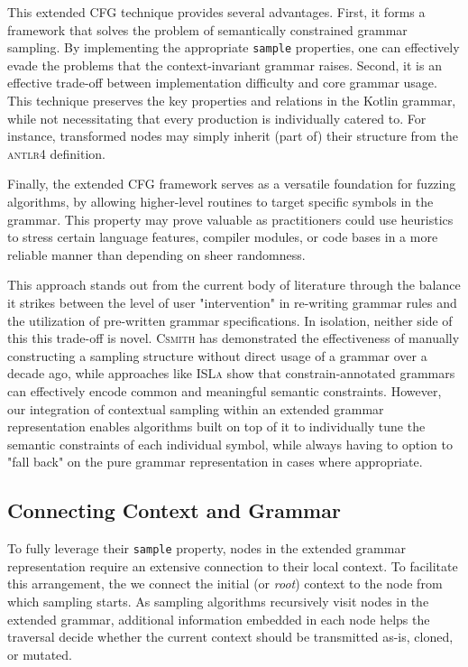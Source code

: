 This extended \gls{CFG} technique provides several advantages.
First, it forms a framework that solves the problem of semantically constrained grammar sampling.
By implementing the appropriate \texttt{sample} properties,
one can effectively evade the problems that the context-invariant grammar raises.
Second, it is an effective trade-off between implementation difficulty and core grammar usage. 
This technique preserves the key properties and relations in the Kotlin grammar, while
not necessitating that every production is individually catered to. 
For instance, transformed nodes may simply inherit (part of) their structure from the
\textsc{antlr4} definition.

Finally, the extended \gls{CFG} framework serves as a versatile foundation for fuzzing
algorithms, by allowing higher-level routines to target specific symbols in the grammar.
This property may prove valuable as practitioners could use heuristics to stress 
certain language features, compiler modules, or code bases in a more reliable
manner than depending on sheer randomness.

This approach stands out from the current body of literature through 
the balance it strikes between the level of user "intervention" in re-writing grammar
rules and the utilization of pre-written grammar specifications.
In isolation, neither side of this this trade-off is novel.
\textsc{Csmith} \cite{yang2011finding} has demonstrated the effectiveness
of manually constructing a sampling structure without
direct usage of a grammar over a decade ago, while approaches like
\textsc{ISLa} \cite{steinhofel2022input} show that
constrain-annotated grammars can effectively encode
common and meaningful semantic constraints.
However, our integration of contextual sampling within an extended
grammar representation enables algorithms built on top of it
to individually tune the semantic constraints of each individual
symbol, while always having to option to "fall back" on the 
pure grammar representation in cases where appropriate.
\subsection{\label{subsec:context-efcg} Connecting Context and Grammar}


To fully leverage their \texttt{sample} property, nodes in the 
extended grammar representation require an extensive connection to their local context.
To facilitate this arrangement, the we connect the initial (or \textit{root})
context to the node from which sampling starts.
As sampling algorithms recursively visit nodes in the extended grammar,
additional information embedded in each node helps the traversal decide
whether the current context should be transmitted as-is, cloned, or mutated.

